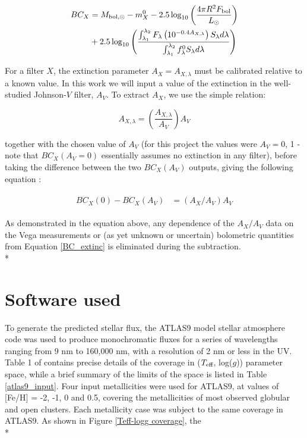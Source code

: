 \documentclass[12pt, a4paper]{report}
\begin{document}
\begin{align}
\begin{split}
BC_{X} &= M_{\textnormal{bol},\odot} - m_{X}^{0} - 2.5 \log_{10} \left( \frac{4\pi R^{2}F_{\textnormal{bol}}}{L_{\odot}} \right) \\
&+ 2.5 \log_{10} \left( \frac{\int_{\lambda_{1}}^{\lambda_{2}} F_{\lambda} \left( 10^{-0.4 A_{X,\lambda}} \right) S_{\lambda} d\lambda}{\int_{\lambda_{1}}^{\lambda_{2}} f_{\lambda}^{0} S_{\lambda} d\lambda} \right)
\label{BC_extinc}
\end{split}
\end{align}

For a filter $X$, the extinction parameter $A_{X} = A_{X,\lambda}$ must be calibrated relative to a known value. In this work we will input a value of the extinction in the well-studied Johnson-$V$ filter, $A_{V}$. To extract $A_{X}$, we use the simple relation:

\begin{equation}
A_{X,\lambda} = \left( \frac{A_{X,\lambda}}{A_{V}} \right) A_{V}
\label{ratio_eq}
\end{equation}

together with the chosen value of $A_{V}$ (for this project the values were $A_{V} = 0$, 1 - note that $BC_{X}(A_{V}=0)$ essentially assumes no extinction in any filter), before taking the difference between the two $BC_{X}(A_{V})$ outputs, giving the following equation \citep{2008PASP..120..583G}:

\begin{align}
\begin{split}
BC_{X}(0) - BC_{X}(A_{V}) &= \left(A_{X}/A_{V}\right)A_{V}
\label{BCs_diff}
\end{split}
\end{align}

As demonstrated in the equation above, any dependence of the $A_{X}/A_{V}$ data on the Vega measurements or (as yet unknown or uncertain) bolometric quantities from Equation \ref{BC_extinc} is eliminated during the subtraction. \\*


\section{Software used}
To generate the predicted stellar flux, the ATLAS9 model stellar atmosphere code \citep{1993KurCD..13.....K} was used to produce monochromatic fluxes for a series of wavelengths ranging from 9 nm to 160,000 nm, with a resolution of 2 nm or less in the UV.  Table 1 of \cite{2004astro.ph..5087C} contains precise details of the coverage in ($T_{\textnormal{eff}}$, log($g$)) parameter space, while a brief summary  of the limits of the space is listed in Table \ref{atlas9_input}. Four input metallicities were used for ATLAS9, at values of [Fe/H] = -2, -1, 0 and 0.5, covering the metallicities of most observed globular and open clusters. Each metallicity case was subject to the same coverage in ATLAS9. As shown in Figure \ref{Teff-logg coverage}, the \\*
\end{document}
